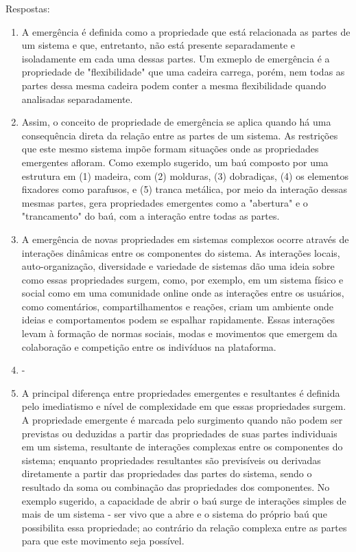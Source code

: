 \documentclass[article,a4paper]{abntex2}
\begin{document}
Respostas:
\begin{enumerate}
    \item A emergência é definida como a propriedade que está relacionada as partes de um sistema e que, entretanto, não está presente separadamente e isoladamente em cada uma dessas partes. Um exmeplo de emergência é a propriedade de "flexibilidade" que uma cadeira carrega, porém, nem todas as partes dessa mesma cadeira podem conter a mesma flexibilidade quando analisadas separadamente.
    \item Assim, o conceito de propriedade de emergência se aplica quando há uma consequência direta da relação entre as partes de um sistema. As restrições que este mesmo sistema impõe formam situações onde as propriedades emergentes afloram. Como exemplo sugerido, um baú composto por uma estrutura em (1) madeira, com (2) molduras, (3) dobradiças, (4) os elementos fixadores como parafusos, e (5) tranca metálica, por meio da interação dessas mesmas partes, gera propriedades emergentes como a "abertura" e o "trancamento" do baú, com a interação entre todas as partes.
    \item A emergência de novas propriedades em sistemas complexos ocorre através de interações dinâmicas entre os componentes do sistema. As interações locais, auto-organização, diversidade e variedade de sistemas dão uma ideia sobre como essas propriedades surgem, como, por exemplo, em um sistema físico e social como em uma comunidade online onde as interações entre os usuários, como comentários, compartilhamentos e reações, criam um ambiente onde ideias e comportamentos podem se espalhar rapidamente. Essas interações levam à formação de normas sociais, modas e movimentos que emergem da colaboração e competição entre os indivíduos na plataforma.
    \item - 
    \item A principal diferença entre propriedades emergentes e resultantes é definida pelo imediatismo e nível de complexidade em que essas propriedades surgem. A propriedade emergente é marcada pelo surgimento quando não podem ser previstas ou deduzidas a partir das propriedades de suas partes individuais em um sistema, resultante de interações complexas entre os componentes do sistema; enquanto propriedades resultantes são previsíveis ou derivadas diretamente a partir das propriedades das partes do sistema, sendo o resultado da soma ou combinação das propriedades dos componentes. No exemplo sugerido, a capacidade de abrir o baú surge de interações simples de mais de um sistema - ser vivo que a abre e o sistema do próprio baú que possibilita essa propriedade; ao contrário da relação complexa entre as partes para que este movimento seja possível.

\end{enumerate}
\end{document}
